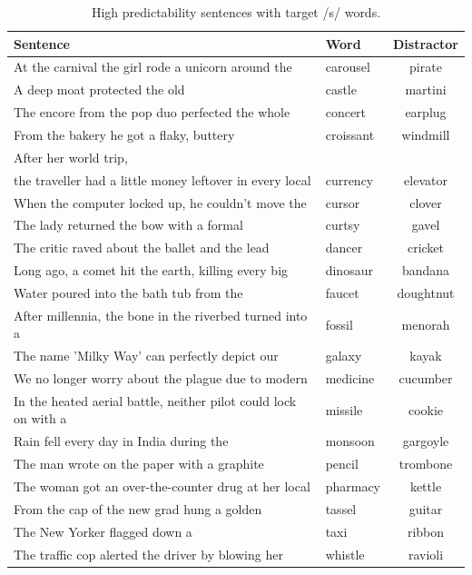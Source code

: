 \begin{table}[!h]
\caption{High predictability sentences with target /s/ words.}
\label{tbl:senthighs}
\small
\centering
\begin{tabular}{llc}
\toprule
Sentence                                                                     & Word        & Distractor  \\
\midrule
At the carnival the girl rode a unicorn around the & carousel & pirate \\
A deep moat protected the old & castle & martini \\
The encore from the pop duo perfected the whole & concert & earplug \\
From the bakery he got a flaky, buttery & croissant & windmill \\
After her world trip, & & \\
the traveller had a little money leftover in every local & currency & elevator \\
When the computer locked up, he couldn't move the & cursor & clover \\
The lady returned the bow with a formal & curtsy & gavel \\
The critic raved about the ballet and the lead & dancer & cricket \\
Long ago, a comet hit the earth, killing every big & dinosaur & bandana \\
Water poured into the bath tub from the & faucet & doughtnut \\
After millennia, the bone in the riverbed turned into a & fossil & menorah \\
The name 'Milky Way' can perfectly depict our & galaxy & kayak \\
We no longer worry about the plague due to modern & medicine & cucumber \\
In the heated aerial battle, neither pilot could lock on with a & missile & cookie \\
Rain fell every day in India during the & monsoon & gargoyle \\
The man wrote on the paper with a graphite & pencil & trombone \\
The woman got an over-the-counter drug at her local & pharmacy & kettle \\
From the cap of the new grad hung a golden & tassel & guitar \\
The New Yorker flagged down a & taxi & ribbon \\
The traffic cop alerted the driver by blowing her & whistle & ravioli \\
\bottomrule
\end{tabular}
\end{table}

